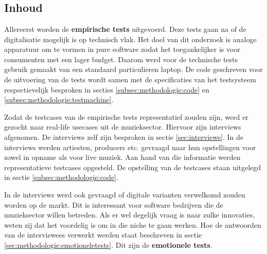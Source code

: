 
\chapter{}
\label{ch:methodologie}


\section{Inhoud}

Allereerst worden de \textbf{empirische tests} uitgevoerd. Deze tests gaan na of de digitalisatie mogelijk is op technisch vlak. Het doel van dit onderzoek is analoge apparatuur om te vormen in pure software zodat het toegankelijker is voor consumenten met een lager budget. Daarom werd voor de technische tests gebruik gemaakt van een standaard particulieren laptop. De code geschreven voor de uitvoering van de tests wordt samen met de specificaties van het testsysteem respectievelijk besproken in secties \ref{subsec:methodologie:code} en \ref{subsec:methodologie:testmachine}.

Zodat de testcases van de empirische tests representatief zouden zijn, werd er gezocht naar real-life usecases uit de muzieksector. Hiervoor zijn interviews afgenomen. De interviews zelf zijn besproken in sectie \ref{sec:interviews}. In de interviews werden artiesten, producers etc. gevraagd naar hun opstellingen voor zowel in opname als voor live muziek. Aan hand van die informatie werden representatieve testcases opgesteld. De opstelling van de testcases staan uitgelegd in sectie \ref{subsec:methodologie:code}. 

In de interviews werd ook gevraagd of digitale varianten verwelkomd zouden worden op de markt. Dit is interessant voor software bedrijven die de muzieksector willen betreden. Als er wel degelijk vraag is naar zulke innovaties, weten zij dat het voordelig is om in die niche te gaan werken. Hoe de antwoorden van de interviewees verwerkt werden staat beschreven in sectie \ref{sec:methodologie:emotioneletests}. Dit zijn de \textbf{emotionele tests}.

